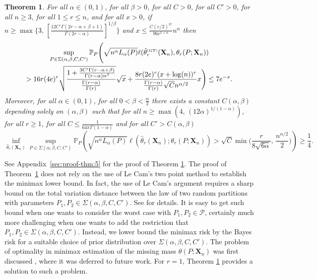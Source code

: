 \documentclass{article}
\newtheorem{theorem}{Theorem}
\newcommand{\1}{\boldsymbol{1}}
\newcommand{\PP}{\mathbb{P}}
\theoremstyle{plain}
\begin{document}
\begin{theorem}
  \label{thm:5}
  For all $\alpha\in (0,1)$, for all $\beta > 0$, for all $C > 0$, for all $C' > 0$, for all $n\geq 3$, for all $1\leq r \leq n$, and for all $x > 0$, if $n \geq \max\{3,\, [\frac{12C'\Gamma(2r-\alpha+\beta+1)}{\Gamma(2r-\alpha)}]^{1/\beta}\}$ and $x \leq \frac{C(e/2)^{2r}}{96r^{1+\alpha}}n^{\alpha}$ then
  \begin{multline*}
     \sup_{P\in \Sigma(\alpha,\beta,C,C')}\PP_P\Bigg(\sqrt{n^{\alpha}L_{\alpha}(P) }\ell(\hat{\theta}_{r}^{\text{\tiny{(GT)}}}(\mathbf{X}_{n}),\theta_r(P;\mathbf{X}_n))\\  >
    16r(4e)^r\sqrt{\frac{1 + \frac{3C'\Gamma(r-\alpha+\beta)}{\Gamma(r-\alpha)n^{\beta}}}
      {\frac{\Gamma(r-\alpha)}{\Gamma(r)}}}\sqrt{x}%
    + \frac{8r(2e)^r(x + \log(n))^r}{\frac{\Gamma(r-\alpha)}{\Gamma(r)} \sqrt{C}n^{\alpha/2}}x\Bigg)
  \leq 7e^{-x}.
  \end{multline*}
  Moreover, for all $\alpha \in (0,1)$, for all $0 < \beta < \frac{\alpha}{2}$ there exists a constant $C(\alpha,\beta)$ depending solely on $(\alpha,\beta)$ such that for all $n \geq \max(4,\, (12\alpha)^{1/(1-\alpha)})$, for all $r\geq 1$, for all $C \leq \frac{1}{64\pi\Gamma(1-\alpha)}$ and for all $C' > C(\alpha,\beta)$
  \begin{displaymath}
    \inf_{\hat{\theta}_r(\mathbf{X}_{n})}\sup_{P\in \Sigma(\alpha,\beta,C,C')}\PP_P\left(\sqrt{n^{\alpha}L_{\alpha}(P) }\ell(\hat{\theta}_r(\mathbf{X}_n);\theta_r(P;\mathbf{X}_n))  > \sqrt{C}\min\Big(\frac{r}{8\sqrt{6\alpha}},\,\frac{n^{\alpha/2}}{2}\Big) \right)%
    \geq \frac{1}{4}.
  \end{displaymath}%
\end{theorem}

See Appendix~\ref{sec:proof-thm:5} for the proof of Theorem \ref{thm:5}. The proof of Theorem~\ref{thm:5} does not rely on the use of  Le Cam's two point method to establish the minimax lower bound. In fact, the use of Le Cam's argument requires a sharp bound on the total variation distance between the law of two random partitions with parameters $P_1,P_2 \in \Sigma(\alpha,\beta,C,C')$. See \cite[Proposition 1]{Fav(22)} for details.  It is easy to get such bound when one wants to consider the worst case with $P_1,P_2 \in \mathcal{P}$, certainly much more challenging when one wants to add the restriction that $P_1,P_2 \in \Sigma(\alpha,\beta,C,C')$. Instead, we lower bound the minimax risk by the Bayes risk for a suitable choice of prior distribution over $\Sigma(\alpha,\beta,C,C')$. The problem of optimality in minimax estimation of the missing mass $\theta(P;\mathbf{X}_{n})$ was first discussed \cite{Fad(18)}, where it was deferred to future work. For $r=1$, Theorem \ref{thm:5} provides a solution to such a problem.
\end{document}
